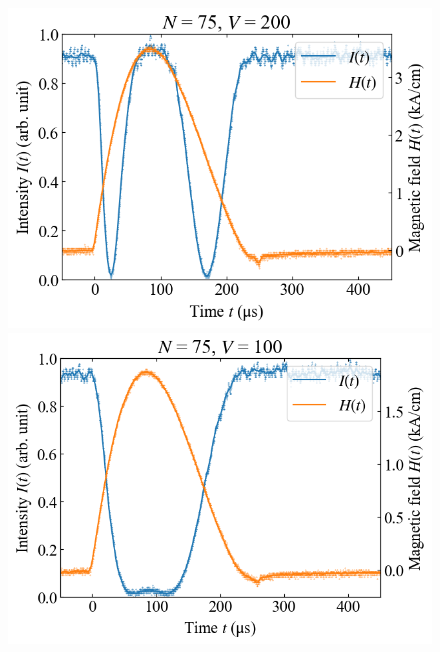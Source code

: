 \documentclass[9pt,dvipdfmx,a4paper]{jsarticle}
\begin{document}
\begin{figure}[H]
\begin{minipage}[t]{0.24\columnwidth}
        \includegraphics[width = \columnwidth]{xt/11.png}
    \end{minipage}
    \hfill
    \begin{minipage}[t]{0.24\columnwidth}
        \centering
        \includegraphics[width = \columnwidth]{xt/12.png}
    \end{minipage}
\end{figure}
\end{document}
